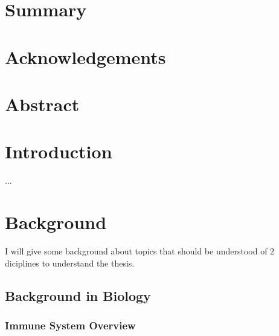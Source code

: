 \documentclass[12pt,a4paper]{report}
\begin{document}
\chapter*{Summary}

\chapter*{Acknowledgements}

\chapter*{Abstract}


\chapter{Introduction}
...

\chapter{Background}

I will give some background about topics that should be understood of 2 diciplines to understand the thesis. 

\section{Background in Biology}

\subsection{Immune System Overview}
\end{document}
